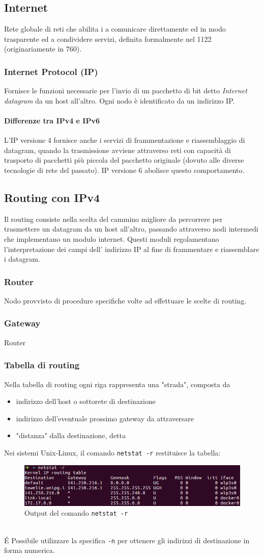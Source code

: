 \documentclass[a4paper,11pt]{article}
\def\code#1{\texttt{#1}}
\def\sub#1{\subsection{#1}\label{#1}}
\def\subsub#1{\subsubsection{#1}\label{#1}}
\def\vedi#1{\nameref{#1}}
\begin{document}

\sub{Internet}
Rete globale di reti che abilita i \vedi{DTE} a comunicare direttamente ed in modo trasparente ed a condividere servizi, definita formalmente nel \vedi{RFC}1122 (originariamente in \vedi{RFC}760).
\subsubsection{Internet Protocol (IP)} \label{IP}
Fornisce le funzioni necessarie per l'invio di un pacchetto di bit detto \textit{Internet datagram} da un host all'altro. Ogni nodo è identificato da un indirizzo IP.
\paragraph{Differenze tra IPv4 e IPv6}
L’IP versione 4 fornisce anche i servizi di
frammentazione e riassemblaggio di datagram,
quando la trasmissione avviene attraverso reti con
capacità di trasporto di pacchetti più piccola del
pacchetto originale (dovuto alle diverse tecnologie di
rete del passato). IP versione 6 abolisce questo
comportamento. %


\subsection{Routing con IPv4} \label{Routing}
Il routing consiste nella scelta del cammino migliore da percorrere per trasmettere un datagram da un host all'altro, passando attraverso nodi intermedi che implementano un modulo internet.
Questi moduli regolamentano l'interpretazione dei campi dell' indirizzo IP al fine di frammentare e riassemblare i datagram.\\

\subsub{Router}
Nodo provvisto di procedure specifiche volte ad effettuare le scelte di routing.

\subsub{Gateway}
Router 

\subsub{Tabella di routing}
Nella tabella di routing ogni riga rappresenta una "strada", composta da 
\begin{itemize}
\item indirizzo dell'host o sottorete di destinazione
\item indirizzo dell'eventuale prossimo gateway da attraversare 
\item "distanza" dalla destinazione, detta \vedi{Metric}  
\end{itemize}
Nei sistemi Unix-Linux, il comando \code{netstat -r} restituisce la tabella:
\begin{figure}[h]
\centering
\includegraphics[scale=0.5]{netstat.png}
\caption{Output del comando \code{netstat -r}}\label{fig. 5}
\end{figure}
\\\'E Possibile utilizzare la specifica \code{-n} per ottenere gli indirizzi di destinazione in forma numerica.
\end{document}
